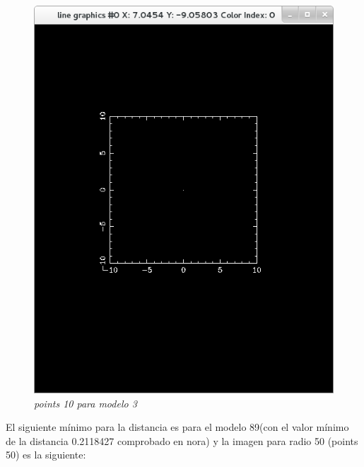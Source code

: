 \documentclass[12pt]{book}
\begin{document}
\begin{itemize}
\begin{figure}[h!]
 \centering
 \includegraphics[scale=0.5]{imgConModel3Points10.png}
 \caption{\emph{points 10 para modelo 3}}
 \label{Fig: 4}
\end{figure}

El siguiente  mínimo para la distancia es para el modelo 89(con el valor mínimo de la distancia 0.2118427 comprobado en nora) y la imagen para radio 50 (points 50) es la siguiente:


\end{itemize}
\end{document}
